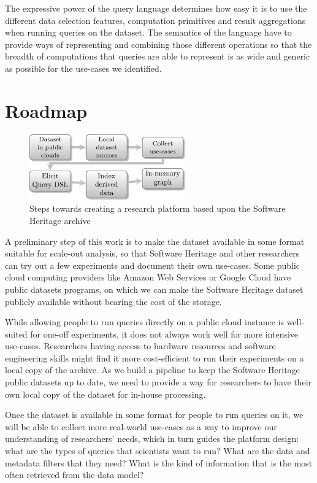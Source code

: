 The expressive power of the query language determines how easy it is to use
the different data selection features, computation primitives and result
aggregations when running queries on the dataset. The semantics of the language
have to provide ways of representing and combining those different operations
so that the breadth of computations that queries are able to represent is as
wide and generic as possible for the use-cases we identified.

\section{Roadmap}

\begin{figure}
\begin{center}
    \includegraphics[width=0.6\textwidth]{img/roadmap}
\end{center}
\caption{Steps towards creating a research platform based upon the Software
Heritage archive}%
\label{fig:roadmap}
\end{figure}

A preliminary step of this work is to make the dataset available in some
format suitable for scale-out analysis, so that Software Heritage and other
researchers can try out a few experiments and document their own use-cases.
Some public cloud computing providers like Amazon Web Services or Google Cloud
have public datasets programs, on which we can make the Software Heritage
dataset publicly available without bearing the cost of the storage.

While allowing people to run queries directly on a public cloud instance is
well-suited for one-off experiments, it does not always work well for more intensive
use-cases. Researchers having access to hardware resources and software engineering
skills might find it more cost-efficient to run their experiments on a local
copy of the archive. As we build a pipeline to keep the Software Heritage
public datasets up to date, we need to provide a way for researchers to have
their own local copy of the dataset for in-house processing.

Once the dataset is available in some format for people to run queries on it,
we will be able to collect more real-world use-cases as a way to improve our
understanding of researchers' needs, which in turn guides the platform design:
what are the types of queries that scientists want to run? What are the data
and metadata filters that they need?  What is the kind of information that is
the most often retrieved from the data model?

